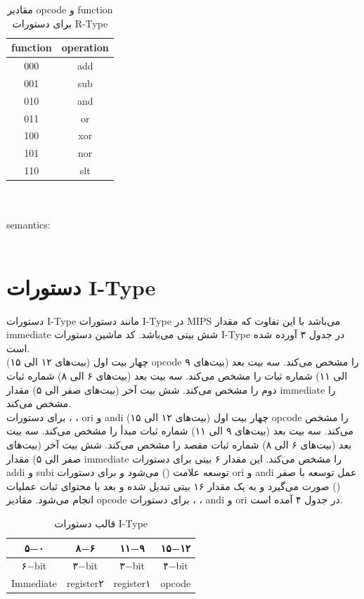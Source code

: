 \begin{table}[H]
    \centering
    \begin{tabular}{|c|c|}
    \hline
    function & operation \\
    \hline
    000 & add \\
    \hline
    001 & sub \\
    \hline
    010 & and \\
    \hline
    011 & or \\
    \hline
    100 & xor \\
    \hline
    101 & nor \\
    \hline
    110 & slt \\
    \hline
    \end{tabular}
    \caption{مقادیر opcode و function برای دستورات R-Type}
    \label{R-Type-Opcode-Values}
\end{table}
\begin{LTR}
    \\
    \\
    {semantics:}\\
    \\
\end{LTR}
\section{دستورات I-Type}
{دستورات I-Type مانند دستورات I-Type در MIPS می‌باشد با این تفاوت که مقدار immediate شش بیتی می‌باشد. کد ماشین دستورات I-Type در جدول ۳ آورده شده است.}\\
{چهار بیت اول (بیت‌های ۱۲ الی ۱۵) opcode را مشخص می‌کند. سه بیت بعد (بیت‌های ۹ الی ۱۱) شماره ثبات را مشخص می‌کند. سه بیت بعد (بیت‌های ۶ الی ۸) شماره ثبات دوم را مشخص می‌کند. شش بیت آخر (بیت‌های صفر الی ۵) مقدار immediate را مشخص می‌کند.}\\
{برای دستورات ، ، ori و andi چهار بیت اول (بیت‌های ۱۲ الی ۱۵) opcode را مشخص می‌کند. سه بیت بعد (بیت‌های ۹ الی ۱۱) شماره ثبات مبدأ را مشخص می‌کند. سه بیت بعد (بیت‌های ۶ الی ۸) شماره ثبات مقصد را مشخص می‌کند. شش بیت آخر (بیت‌های صفر الی ۵) مقدار immediate را مشخص می‌کند. این مقدار ۶ بیتی برای دستورات addi و subi توسعه علامت () می‌شود و برای دستورات ori و andi عمل توسعه با صفر () صورت می‌گیرد و به یک مقدار ۱۶ بیتی تبدیل شده و بعد با محتوای ثبات عملیات انجام می‌شود. مقادیر opcode برای دستورات ، ، andi و ori در جدول ۴ آمده است.}\\
\begin{table}[H]
    \centering
    \begin{tabular}{|c|c|c|c|}
    \hline
    ۵−۰ & ۸−۶ & ۱۱−۹ & ۱۵−۱۲ \\
    \hline
    ۶−bit & ۳−bit & ۳−bit & ۴−bit \\
    \hline
    Immediate & register۲ & register۱ & opcode \\
    \hline
    \end{tabular}
    \caption{قالب دستورات I-Type}
    \label{I-Type-Instructions-Template}
\end{table}

